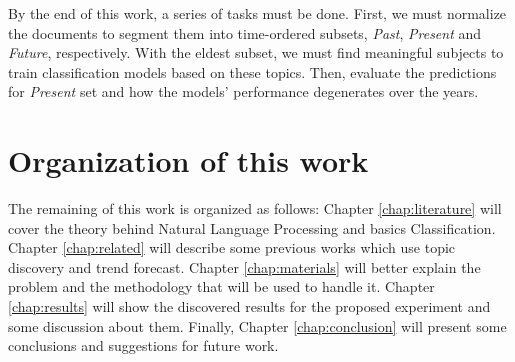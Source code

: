 By the end of this work, a series of tasks must be done. First, we must normalize the documents to segment them into time-ordered subsets, \textit{Past}, \textit{Present} and \textit{Future}, respectively. With the eldest subset, we must find meaningful subjects to train classification models based on these topics. Then, evaluate the predictions for \textit{Present} set and how the models' performance degenerates over the years.


%
%

\section{Organization of this work}

The remaining of this work is organized as follows: Chapter \ref{chap:literature} will cover the theory behind Natural Language Processing and basics Classification. Chapter \ref{chap:related} will describe some previous works which use topic discovery and trend forecast. Chapter \ref{chap:materials} will better explain the problem and the methodology that will be used to handle it. Chapter \ref{chap:results} will show the discovered results for the proposed experiment and some discussion about them. Finally, Chapter \ref{chap:conclusion} will present some conclusions and suggestions for future work.
